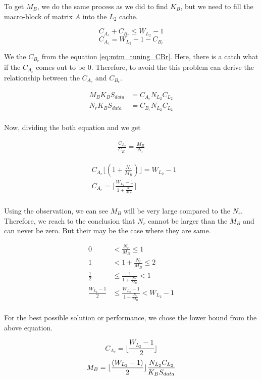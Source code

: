 To get $M_B$, we do the same process as we did to find $K_B$, but we need to fill 
the macro-block of matrix $A$ into the $L_2$ cache.

\[C_{A_c} + C_{B_r} \leq W_{L_2} - 1\]
\[C_{A_c} = W_{L_2} - 1 - C_{B_r}\]

We the $C_{B_r}$ from the equation \ref{eq:mtm_tuning_CBr}. Here, there is a catch what if
the $C_{A_c}$ comes out to be $0$. Therefore, to avoid the this problem can derive the 
relationship between the $C_{A_c}$ and $C_{B_r}$.

\begin{align*}
    M_B K_B S_{data} &= C_{A_c} N_{L_2} C_{L_2}\\
    N_r K_B S_{data} &= C_{B_r} N_{L_2} C_{L_2}\\
\end{align*}

Now, dividing the both equation and we get

\begin{align*}
    \frac{C_{A_c}}{C_{B_r}} = \frac{M_B}{N_r}
\end{align*}

\begin{align*}
    &C_{A_c} \lfloor ( 1 + \frac{N_r}{M_B} ) \rfloor = W_{L_2} - 1\\
    &C_{A_c} = \lceil \frac{W_{L_2} - 1}{1 + \frac{N_r}{M_B}} \rceil\\
\end{align*}

Using the observation, we can see $M_B$ will be very large compared to the $N_r$. Therefore,
we reach to the conclusion that $N_r$ cannot be larger than the $M_B$ and can never be zero.
But their may be the case where they are same.


\begin{align*}
    0 &< \frac{N_r}{M_B} \leq 1\\
    1 &< 1 + \frac{N_r}{M_B} \leq 2\\
    \frac{1}{2} &\leq \frac{1}{1 + \frac{N_r}{M_B}} < 1\\
    \frac{W_{L_2} - 1}{2} &\leq \frac{W_{L_2} - 1}{1 + \frac{N_r}{M_B}} < W_{L_2} - 1\\
\end{align*}

For the best possible solution or performance, we chose the lower bound from the above equation.

\[
    C_{A_c} = \lfloor \frac{W_{L_2} - 1}{2} \rfloor
\]
\[
    M_B = \lfloor \frac{(W_{L_2} - 1)}{2} \rfloor \frac{N_{L_2} C_{L_2}}{K_B S_{data}}\\
\]

